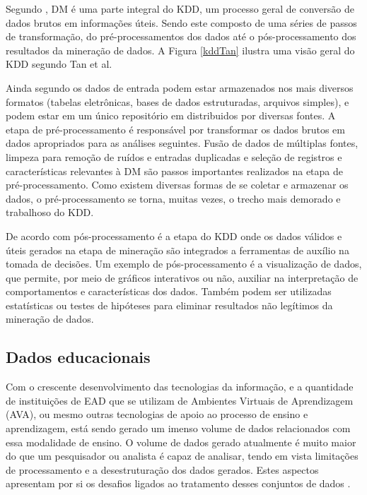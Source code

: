 Segundo , DM é uma parte integral do KDD, um
processo geral de conversão de dados brutos em informações úteis. Sendo este
composto de uma séries de passos de transformação, do pré-processamentos dos
dados até o pós-processamento dos resultados da mineração de dados. A Figura
\ref{kddTan} ilustra uma visão geral do KDD segundo Tan et al.


Ainda segundo  os dados de entrada podem estar
armazenados nos mais diversos formatos (tabelas eletrônicas, bases de dados
estruturadas, arquivos simples), e podem estar em um único repositório em
distribuidos por diversas fontes. A etapa de pré-processamento é responsável por
transformar os dados brutos em dados apropriados para as análises seguintes.
Fusão de dados de múltiplas fontes, limpeza para remoção de ruídos e entradas
duplicadas e seleção de registros e características relevantes à DM são passos
importantes realizados na etapa de pré-processamento. Como existem diversas
formas de se coletar e armazenar os dados, o pré-processamento se torna, muitas
vezes, o trecho mais demorado e trabalhoso do KDD.

De acordo com  pós-processamento é a etapa do KDD
onde os dados válidos e úteis gerados na etapa de mineração são integrados a
ferramentas de auxílio na tomada de decisões. Um exemplo de pós-processamento é
a visualização de dados, que permite, por meio de gráficos interativos ou não,
auxiliar na interpretação de comportamentos e características dos dados. Também
podem ser utilizadas estatísticas ou testes de hipóteses para eliminar
resultados não legítimos da mineração de dados.

\subsection{Dados educacionais}

Com o crescente desenvolvimento das tecnologias da informação, e a quantidade de
instituições de EAD que se utilizam de Ambientes Virtuais de Aprendizagem (AVA),
ou mesmo outras tecnologias de apoio ao processo de ensino e aprendizagem, está
sendo gerado um imenso volume de dados relacionados com essa modalidade de
ensino. O volume de dados gerado atualmente é muito maior do que um pesquisador
ou analista  é capaz de analisar, tendo em vista limitações de processamento e a
desestruturação dos dados gerados. Estes aspectos apresentam por si os desafios
ligados ao tratamento desses conjuntos de dados
\cite{rigo2014aplicaccoes,costa2012mineraccao}.

